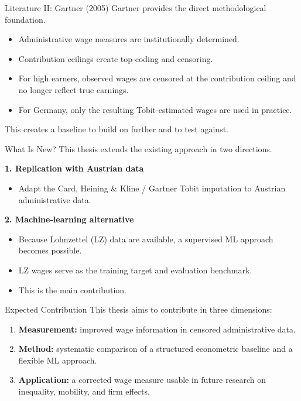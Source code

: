 \documentclass[10pt]{beamer}
\begin{document}
\begin{frame}{Literature II: Gartner (2005)}
Gartner provides the direct methodological foundation.

\vspace{0.3cm}
\begin{itemize}
    \item Administrative wage measures are institutionally determined.
    \item Contribution ceilings create top-coding and censoring.
    \item For high earners, observed wages are censored at the contribution ceiling and no longer reflect true earnings.
    \item For Germany, only the resulting Tobit-estimated wages are used in practice.
\end{itemize}

\vspace{0.3cm}
This creates a baseline to build on further and to test against.
\end{frame}

\begin{frame}{What Is New?}
This thesis extends the existing approach in two directions.

\vspace{0.3cm}
\textbf{1. Replication with Austrian data}
\begin{itemize}
    \item Adapt the Card, Heining \& Kline / Gartner Tobit imputation to Austrian administrative data.
\end{itemize}

\vspace{0.3cm}
\textbf{2. Machine-learning alternative}
\begin{itemize}
    \item Because Lohnzettel (LZ) data are available, a supervised ML approach becomes possible.
    \item LZ wages serve as the training target and evaluation benchmark.
    \item This is the main contribution.
\end{itemize}
\end{frame}

\begin{frame}{Expected Contribution}
This thesis aims to contribute in three dimensions:
\begin{enumerate}
    \item \textbf{Measurement:} improved wage information in censored administrative data.
    \item \textbf{Method:} systematic comparison of a structured econometric baseline and a flexible ML approach.
    \item \textbf{Application:} a corrected wage measure usable in future research on inequality, mobility, and firm effects.
\end{enumerate}
\end{frame}
\end{document}
